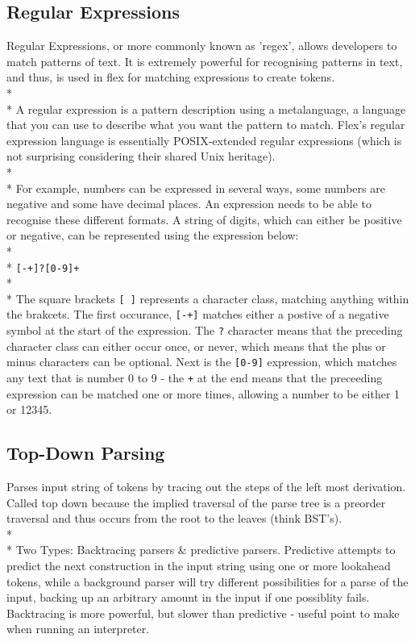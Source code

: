 \documentclass[12pt]{report}
\begin{document}
\subsection{Regular Expressions}\label{subsec:regex}
Regular Expressions, or more commonly known as 'regex', allows developers to match patterns of text.  It is extremely powerful for recognising patterns in text, and thus, is used in flex for matching expressions to create tokens.
\\*
\\*
A regular expression is a pattern description using a metalanguage, a language that you can use to describe what you want the pattern to match.  Flex's regular expression language is essentially POSIX-extended regular expressions (which is not surprising considering their shared Unix heritage).\citep{flexandbison09}
\\*
\\*
For example, numbers can be expressed in several ways, some numbers are negative and some have decimal places.  An expression needs to be able to recognise these different formats.  A string of digits, which can either be positive or negative, can be represented using the expression below:\\*
\\*
\texttt{[-+]?[0-9]+}
\\*
\\*
The square brackets \texttt{[ ]} represents a character class, matching anything within the brakcets.  The first occurance, \texttt{[-+]} matches either a postive of a negative symbol at the start of the expression.  The \texttt{?} character means that the preceding character class can either occur once, or never, which means that the plus or minus characters can be optional.  Next is the \texttt{[0-9]} expression, which matches any text that is number 0 to 9 - the \texttt{+} at the end means that the preceeding expression can be matched one or more times, allowing a number to be either 1 or 12345.

\subsection{Top-Down Parsing}\label{subsec:top_down_parsing}
Parses input string of tokens by tracing out the steps of the left most derivation.  Called top down because the implied traversal of the parse tree is a preorder traversal and thus occurs from the root to the leaves (think BST's).
\\*
\\*
Two Types: Backtracing parsers \& predictive parsers.
Predictive attempts to predict the next construction in the input string using one or more lookahead tokens, while a background parser will try different possibilities for a parse of the input, backing up an arbitrary amount in the input if one possiblity fails.  Backtracing is more powerful, but slower than predictive - useful point to make when running an interpreter.\citep{compilerconstruction97}
\end{document}
